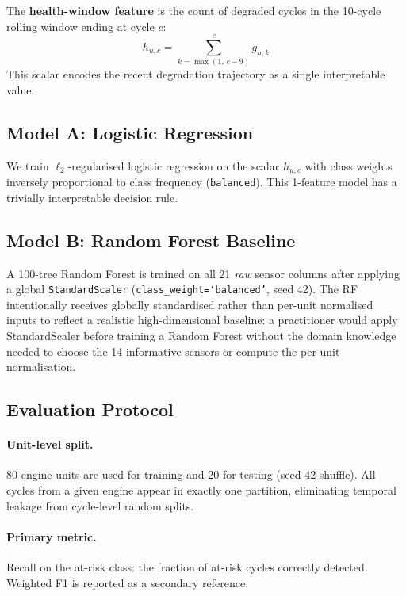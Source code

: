 \documentclass[10pt,twocolumn]{article}
\begin{document}
The \textbf{health-window feature} is the count of degraded cycles in the 10-cycle
rolling window ending at cycle $c$:
\begin{equation}
  h_{u,c}=\sum_{k=\max(1,\,c-9)}^{c}g_{u,k}
\end{equation}
This scalar encodes the recent degradation trajectory as a single interpretable value.

\subsection{Model A: Logistic Regression}

We train $\ell_2$-regularised logistic regression on the scalar $h_{u,c}$ with
class weights inversely proportional to class frequency (\texttt{balanced}).
This 1-feature model has a trivially interpretable decision rule.

\subsection{Model B: Random Forest Baseline}

A 100-tree Random Forest is trained on all 21 \emph{raw} sensor columns after
applying a global \texttt{StandardScaler} (\texttt{class\_weight=`balanced'}, seed 42).
The RF intentionally receives globally standardised rather than per-unit normalised
inputs to reflect a realistic high-dimensional baseline: a practitioner would apply
StandardScaler before training a Random Forest without the domain knowledge needed
to choose the 14 informative sensors or compute the per-unit normalisation.

\subsection{Evaluation Protocol}

\paragraph{Unit-level split.}
80 engine units are used for training and 20 for testing (seed 42 shuffle).
All cycles from a given engine appear in exactly one partition, eliminating
temporal leakage from cycle-level random splits.

\paragraph{Primary metric.}
Recall on the at-risk class: the fraction of at-risk cycles correctly detected.
Weighted F1 is reported as a secondary reference.
\end{document}
